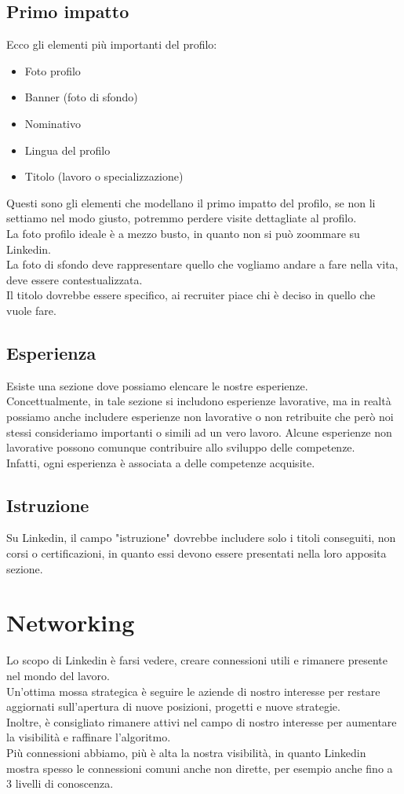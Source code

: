 \documentclass[12pt,a4paper]{article}
\let\oldsection\section
\renewcommand{\section}{\clearpage\oldsection}
\begin{document}
\subsection{Primo impatto}
Ecco gli elementi più importanti del profilo:
\begin{itemize}
    \item Foto profilo
    \item Banner (foto di sfondo)
    \item Nominativo
    \item Lingua del profilo
    \item Titolo (lavoro o specializzazione)
\end{itemize}
Questi sono gli elementi che modellano il primo impatto del profilo, se non li settiamo nel modo giusto, potremmo perdere visite dettagliate al profilo.\\
La foto profilo ideale è a mezzo busto, in quanto non si può zoommare su Linkedin.\\
La foto di sfondo deve rappresentare quello che vogliamo andare a fare nella vita, deve essere contestualizzata.\\
Il titolo dovrebbe essere specifico, ai recruiter piace chi è deciso in quello che vuole fare.
\subsection{Esperienza}
Esiste una sezione dove possiamo elencare le nostre esperienze.\\
Concettualmente, in tale sezione si includono esperienze lavorative, ma in realtà possiamo anche includere esperienze non lavorative o non retribuite che però noi stessi consideriamo importanti o simili ad un vero lavoro. Alcune esperienze non lavorative possono comunque contribuire allo sviluppo delle competenze.\\
Infatti, ogni esperienza è associata a delle competenze acquisite.
\subsection{Istruzione}
Su Linkedin, il campo "istruzione" dovrebbe includere solo i titoli conseguiti, non corsi o certificazioni, in quanto essi devono essere presentati nella loro apposita sezione.

\section{Networking}
Lo scopo di Linkedin è farsi vedere, creare connessioni utili e rimanere presente nel mondo del lavoro.\\
Un'ottima mossa strategica è seguire le aziende di nostro interesse per restare aggiornati sull'apertura di nuove posizioni, progetti e nuove strategie.\\
Inoltre, è consigliato rimanere attivi nel campo di nostro interesse per aumentare la visibilità e raffinare l'algoritmo.\\
Più connessioni abbiamo, più è alta la nostra visibilità, in quanto Linkedin mostra spesso le connessioni comuni anche non dirette, per esempio anche fino a 3 livelli di conoscenza.
\end{document}
